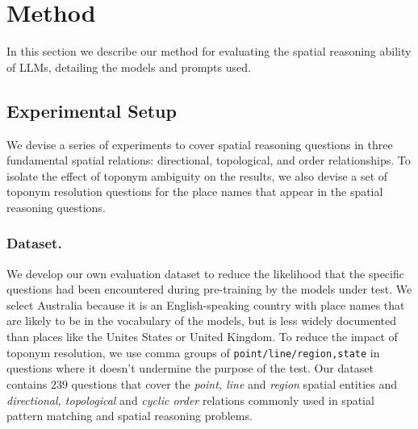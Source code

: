 \section{Method}
\label{section:method}

In this section we describe our method for evaluating the spatial reasoning ability of LLMs, detailing the models and prompts used.


\subsection{Experimental Setup}
We devise a series of experiments to cover spatial reasoning questions in three fundamental spatial relations: directional, topological, and order relationships.
To isolate the effect of toponym ambiguity on the results, we also devise a set of toponym resolution questions for the place names that appear in the spatial reasoning questions.

\subsubsection{Dataset.} 
We develop our own evaluation dataset to reduce the likelihood that the specific questions had been encountered during pre-training by the models under test. 
We select Australia because it is an English-speaking country with place names that are likely to be in the vocabulary of the models, but is less widely documented than places like the Unites States or United Kingdom. 
To reduce the impact of toponym resolution, we use comma groups of \texttt{point/line/region,state} in questions where it doesn't undermine the purpose of the test.
Our dataset contains $239$  questions that cover the \textit{point, line} and \textit{region} spatial entities and \textit{directional, topological} and \textit{cyclic order} relations commonly used in spatial pattern matching and spatial reasoning problems.


